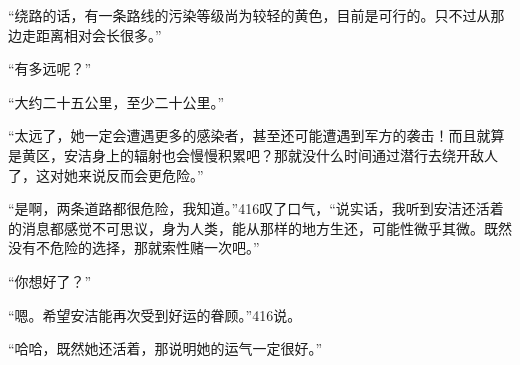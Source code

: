 “绕路的话，有一条路线的污染等级尚为较轻的黄色，目前是可行的。只不过从那边走距离相对会长很多。”

“有多远呢？”

“大约二十五公里，至少二十公里。”

“太远了，她一定会遭遇更多的感染者，甚至还可能遭遇到军方的袭击！而且就算是黄区，安洁身上的辐射也会慢慢积累吧？那就没什么时间通过潜行去绕开敌人了，这对她来说反而会更危险。”

“是啊，两条道路都很危险，我知道。”416叹了口气，“说实话，我听到安洁还活着的消息都感觉不可思议，身为人类，能从那样的地方生还，可能性微乎其微。既然没有不危险的选择，那就索性赌一次吧。”

“你想好了？”

“嗯。希望安洁能再次受到好运的眷顾。”416说。

“哈哈，既然她还活着，那说明她的运气一定很好。”

